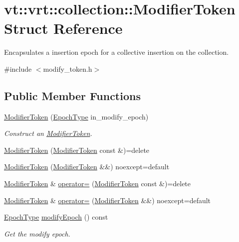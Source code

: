 \hypertarget{structvt_1_1vrt_1_1collection_1_1_modifier_token}{}\section{vt\+:\+:vrt\+:\+:collection\+:\+:Modifier\+Token Struct Reference}
\label{structvt_1_1vrt_1_1collection_1_1_modifier_token}


Encapsulates a insertion epoch for a collective insertion on the collection.  




{\ttfamily \#include $<$modify\+\_\+token.\+h$>$}

\subsection*{Public Member Functions}
\begin{DoxyCompactItemize}
\item 
\hyperlink{structvt_1_1vrt_1_1collection_1_1_modifier_token_a6c0d5fed4a1575396c0e2f6656cffd75}{Modifier\+Token} (\hyperlink{namespacevt_a81d11b28122d43bf9834577e4a06440f}{Epoch\+Type} in\+\_\+modify\+\_\+epoch)
\begin{DoxyCompactList}\small\item\em Construct an {\ttfamily \hyperlink{structvt_1_1vrt_1_1collection_1_1_modifier_token}{Modifier\+Token}}. \end{DoxyCompactList}\item 
\hyperlink{structvt_1_1vrt_1_1collection_1_1_modifier_token_a4aa2f4483c7361fb217299825fc58824}{Modifier\+Token} (\hyperlink{structvt_1_1vrt_1_1collection_1_1_modifier_token}{Modifier\+Token} const \&)=delete
\item 
\hyperlink{structvt_1_1vrt_1_1collection_1_1_modifier_token_ad28f1fc8ed13262f976b9c4b6bd89510}{Modifier\+Token} (\hyperlink{structvt_1_1vrt_1_1collection_1_1_modifier_token}{Modifier\+Token} \&\&) noexcept=default
\item 
\hyperlink{structvt_1_1vrt_1_1collection_1_1_modifier_token}{Modifier\+Token} \& \hyperlink{structvt_1_1vrt_1_1collection_1_1_modifier_token_ae5bb7550e56586506bf2823603023109}{operator=} (\hyperlink{structvt_1_1vrt_1_1collection_1_1_modifier_token}{Modifier\+Token} const \&)=delete
\item 
\hyperlink{structvt_1_1vrt_1_1collection_1_1_modifier_token}{Modifier\+Token} \& \hyperlink{structvt_1_1vrt_1_1collection_1_1_modifier_token_a781c57243819fb3bd6f37b60f97faf0a}{operator=} (\hyperlink{structvt_1_1vrt_1_1collection_1_1_modifier_token}{Modifier\+Token} \&\&) noexcept=default
\item 
\hyperlink{namespacevt_a81d11b28122d43bf9834577e4a06440f}{Epoch\+Type} \hyperlink{structvt_1_1vrt_1_1collection_1_1_modifier_token_a2a87237f09095f3284a5ebea7b9976e9}{modify\+Epoch} () const
\begin{DoxyCompactList}\small\item\em Get the modify epoch. \end{DoxyCompactList}\end{DoxyCompactItemize}
